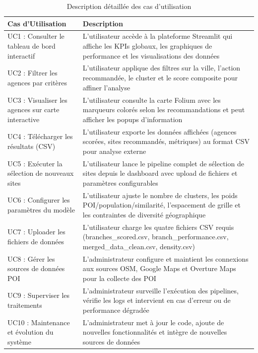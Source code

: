 \documentclass[11pt,a4paper,twoside]{report}
\begin{document}
\begingroup
\small
\renewcommand{\arraystretch}{1.2}
\begin{longtable}{|p{3.8cm}|p{9.7cm}|}
\caption{Description détaillée des cas d'utilisation} \label{tab:uc} \\
\hline
\textbf{Cas d'Utilisation} & \textbf{Description} \\
\hline
\endfirsthead
\endhead
\hline
\endfoot
\hline
\endlastfoot

UC1 : Consulter le tableau de bord interactif & L'utilisateur accède à la plateforme Streamlit qui affiche les KPIs globaux, les graphiques de performance et les visualisations des données \\
\hline
UC2 : Filtrer les agences par critères & L'utilisateur applique des filtres sur la ville, l'action recommandée, le cluster et le score composite pour affiner l'analyse \\
\hline
UC3 : Visualiser les agences sur carte interactive & L'utilisateur consulte la carte Folium avec les marqueurs colorés selon les recommandations et peut afficher les popups d'information \\
\hline
UC4 : Télécharger les résultats (CSV) & L'utilisateur exporte les données affichées (agences scorées, sites recommandés, métriques) au format CSV pour analyse externe \\
\hline
UC5 : Exécuter la sélection de nouveaux sites & L'utilisateur lance le pipeline complet de sélection de sites depuis le dashboard avec upload de fichiers et paramètres configurables \\
\hline
UC6 : Configurer les paramètres du modèle & L'utilisateur ajuste le nombre de clusters, les poids POI/population/similarité, l'espacement de grille et les contraintes de diversité géographique \\
\hline
UC7 : Uploader les fichiers de données & L'utilisateur charge les quatre fichiers CSV requis (branches\_scored.csv, branch\_performance.csv, merged\_data\_clean.csv, density.csv) \\
\hline
UC8 : Gérer les sources de données POI & L'administrateur configure et maintient les connexions aux sources OSM, Google Maps et Overture Maps pour la collecte des POI \\
\hline
UC9 : Superviser les traitements & L'administrateur surveille l'exécution des pipelines, vérifie les logs et intervient en cas d'erreur ou de performance dégradée \\
\hline
UC10 : Maintenance et évolution du système & L'administrateur met à jour le code, ajoute de nouvelles fonctionnalités et intègre de nouvelles sources de données \\

\end{longtable}
\end{document}
